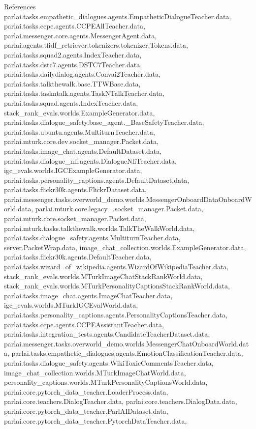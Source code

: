 References parlai.\+tasks.\+empathetic\+\_\+dialogues.\+agents.\+Empathetic\+Dialogue\+Teacher.\+data, parlai.\+tasks.\+ccpe.\+agents.\+C\+C\+P\+E\+All\+Teacher.\+data, parlai.\+messenger.\+core.\+agents.\+Messenger\+Agent.\+data, parlai.\+agents.\+tfidf\+\_\+retriever.\+tokenizers.\+tokenizer.\+Tokens.\+data, parlai.\+tasks.\+squad2.\+agents.\+Index\+Teacher.\+data, parlai.\+tasks.\+dstc7.\+agents.\+D\+S\+T\+C7\+Teacher.\+data, parlai.\+tasks.\+dailydialog.\+agents.\+Convai2\+Teacher.\+data, parlai.\+tasks.\+talkthewalk.\+base.\+T\+T\+W\+Base.\+data, parlai.\+tasks.\+taskntalk.\+agents.\+Task\+N\+Talk\+Teacher.\+data, parlai.\+tasks.\+squad.\+agents.\+Index\+Teacher.\+data, stack\+\_\+rank\+\_\+evals.\+worlds.\+Example\+Generator.\+data, parlai.\+tasks.\+dialogue\+\_\+safety.\+base\+\_\+agent.\+\_\+\+Base\+Safety\+Teacher.\+data, parlai.\+tasks.\+ubuntu.\+agents.\+Multiturn\+Teacher.\+data, parlai.\+mturk.\+core.\+dev.\+socket\+\_\+manager.\+Packet.\+data, parlai.\+tasks.\+image\+\_\+chat.\+agents.\+Default\+Dataset.\+data, parlai.\+tasks.\+dialogue\+\_\+nli.\+agents.\+Dialogue\+Nli\+Teacher.\+data, igc\+\_\+evals.\+worlds.\+I\+G\+C\+Example\+Generator.\+data, parlai.\+tasks.\+personality\+\_\+captions.\+agents.\+Default\+Dataset.\+data, parlai.\+tasks.\+flickr30k.\+agents.\+Flickr\+Dataset.\+data, parlai.\+messenger.\+tasks.\+overworld\+\_\+demo.\+worlds.\+Messenger\+Onboard\+Data\+Onboard\+World.\+data, parlai.\+mturk.\+core.\+legacy\+\_.\+socket\+\_\+manager.\+Packet.\+data, parlai.\+mturk.\+core.\+socket\+\_\+manager.\+Packet.\+data, parlai.\+mturk.\+tasks.\+talkthewalk.\+worlds.\+Talk\+The\+Walk\+World.\+data, parlai.\+tasks.\+dialogue\+\_\+safety.\+agents.\+Multiturn\+Teacher.\+data, server.\+Packet\+Wrap.\+data, image\+\_\+chat\+\_\+collection.\+worlds.\+Example\+Generator.\+data, parlai.\+tasks.\+flickr30k.\+agents.\+Default\+Teacher.\+data, parlai.\+tasks.\+wizard\+\_\+of\+\_\+wikipedia.\+agents.\+Wizard\+Of\+Wikipedia\+Teacher.\+data, stack\+\_\+rank\+\_\+evals.\+worlds.\+M\+Turk\+Image\+Chat\+Stack\+Rank\+World.\+data, stack\+\_\+rank\+\_\+evals.\+worlds.\+M\+Turk\+Personality\+Captions\+Stack\+Rank\+World.\+data, parlai.\+tasks.\+image\+\_\+chat.\+agents.\+Image\+Chat\+Teacher.\+data, igc\+\_\+evals.\+worlds.\+M\+Turk\+I\+G\+C\+Eval\+World.\+data, parlai.\+tasks.\+personality\+\_\+captions.\+agents.\+Personality\+Captions\+Teacher.\+data, parlai.\+tasks.\+ccpe.\+agents.\+C\+C\+P\+E\+Assistant\+Teacher.\+data, parlai.\+tasks.\+integration\+\_\+tests.\+agents.\+Candidate\+Teacher\+Dataset.\+data, parlai.\+messenger.\+tasks.\+overworld\+\_\+demo.\+worlds.\+Messenger\+Chat\+Onboard\+World.\+data, parlai.\+tasks.\+empathetic\+\_\+dialogues.\+agents.\+Emotion\+Classification\+Teacher.\+data, parlai.\+tasks.\+dialogue\+\_\+safety.\+agents.\+Wiki\+Toxic\+Comments\+Teacher.\+data, image\+\_\+chat\+\_\+collection.\+worlds.\+M\+Turk\+Image\+Chat\+World.\+data, personality\+\_\+captions.\+worlds.\+M\+Turk\+Personality\+Captions\+World.\+data, parlai.\+core.\+pytorch\+\_\+data\+\_\+teacher.\+Loader\+Process.\+data, parlai.\+core.\+teachers.\+Dialog\+Teacher.\+data, parlai.\+core.\+teachers.\+Dialog\+Data.\+data, parlai.\+core.\+pytorch\+\_\+data\+\_\+teacher.\+Parl\+A\+I\+Dataset.\+data, parlai.\+core.\+pytorch\+\_\+data\+\_\+teacher.\+Pytorch\+Data\+Teacher.\+data, 